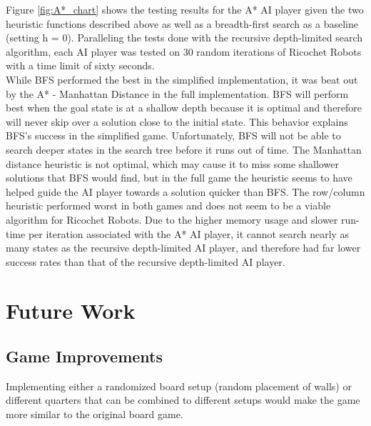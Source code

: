 \documentclass[a4paper,10pt]{article}
\begin{document}
  Figure \ref{fig:A*_chart} shows the testing results for the A* AI player given the two heuristic functions described above as well as a breadth-first search as a
  baseline (setting h = 0).  Paralleling the tests done with the recursive depth-limited search algorithm, each AI player was tested on 30 random iterations of Ricochet
  Robots with a time limit of sixty seconds. \\
  While BFS performed the best in the simplified implementation, it was beat out by the A* - Manhattan Distance in the full implementation.  BFS will perform best when
  the goal state is at a shallow depth because it is optimal and therefore will never skip over a solution close to the initial state.  This behavior explains BFS's
  success in the simplified game.  Unfortunately, BFS will not be able to search deeper states in the search tree before it runs out of time.  The Manhattan distance
  heuristic is not optimal, which may cause it to miss some shallower solutions that BFS would find, but in the full game the heuristic seems to have helped guide the AI
  player towards a solution quicker than BFS.  The row/column heuristic performed worst in both games and does not seem to be a viable algorithm for Ricochet Robots.
  Due to the higher memory usage and slower run-time per iteration associated with the A* AI player, it cannot search nearly as many states as the recursive depth-limited
  AI player, and therefore had far lower success rates than that of the recursive depth-limited AI player.

\section{Future Work}
\label{sec:futureWork}

  \subsection{Game Improvements}
  Implementing either a randomized board setup (random placement of walls) or different quarters that can be combined to different setups would make the game more similar to the original board game.
\end{document}
